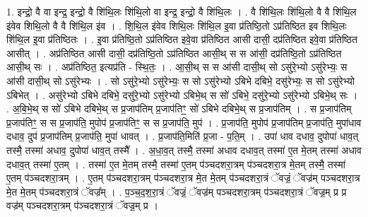 \documentclass[17pt]{extarticle}
\begin{document}
1. इन्द्रो॒ वै वा इन्द्र॒ इन्द्रो॒ वै शि॑थि॒लः शि॑थि॒लो वा इन्द्र॒ इन्द्रो॒ वै शि॑थि॒लः । . वै शि॑थि॒लः शि॑थि॒लो वै वै शि॑थि॒ल इ॑वेव शिथि॒लो वै वै शि॑थि॒ल इ॑व । . शि॒थि॒ल इ॑वेव शिथि॒लः शि॑थि॒ल इ॒वा प्र॑तिष्ठि॒तो ऽप्र॑तिष्ठित इव शिथि॒लः शि॑थि॒ल इ॒वा प्र॑तिष्ठितः । . इ॒वा प्र॑तिष्ठि॒तो ऽप्र॑तिष्ठित इवे॒वा प्र॑तिष्ठित आसी दासी॒ दप्र॑तिष्ठित इवे॒वा प्र॑तिष्ठित आसीत् । . अप्र॑तिष्ठित आसी दासी॒ दप्र॑तिष्ठि॒तो ऽप्र॑तिष्ठित आसी॒थ् स स आ॑सी॒ दप्र॑तिष्ठि॒तो ऽप्र॑तिष्ठित आसी॒थ् सः । . अप्र॑तिष्ठित॒ इत्यप्र॑ति - स्थि॒तः॒ । . आ॒सी॒थ् स स आ॑सी दासी॒थ् सो ऽसु॑रे॒भ्यो ऽसु॑रेभ्यः॒ स आ॑सी दासी॒थ् सो ऽसु॑रेभ्यः । . सो ऽसु॑रे॒भ्यो ऽसु॑रेभ्यः॒ स सो ऽसु॑रेभ्यो ऽबिभे दबिभे॒ दसु॑रेभ्यः॒ स सो ऽसु॑रेभ्यो ऽबिभेत् । . असु॑रेभ्यो ऽबिभे दबिभे॒ दसु॑रे॒भ्यो ऽसु॑रेभ्यो ऽबिभे॒थ् स सो॑ ऽबिभे॒ दसु॑रे॒भ्यो ऽसु॑रेभ्यो ऽबिभे॒थ् सः । . अ॒बि॒भे॒थ् स सो॑ ऽबिभे दबिभे॒थ् स प्र॒जाप॑तिम् प्र॒जाप॑तिꣳ॒॒ सो॑ ऽबिभे दबिभे॒थ् स प्र॒जाप॑तिम् । . स प्र॒जाप॑तिम् प्र॒जाप॑तिꣳ॒॒ स स प्र॒जाप॑ति॒ मुपोप॑ प्र॒जाप॑तिꣳ॒॒ स स प्र॒जाप॑ति॒ मुप॑ । . प्र॒जाप॑ति॒ मुपोप॑ प्र॒जाप॑तिम् प्र॒जाप॑ति॒ मुपा॑धाव दधाव॒ दुप॑ प्र॒जाप॑तिम् प्र॒जाप॑ति॒ मुपा॑ धावत् । . प्र॒जाप॑ति॒मिति॑ प्र॒जा - प॒ति॒म् । . उपा॑ धाव दधाव॒ दुपोपा॑ धाव॒त् तस्मै॒ तस्मा॑ अधाव॒ दुपोपा॑ धाव॒त् तस्मै᳚ । . अ॒धा॒व॒त् तस्मै॒ तस्मा॑ अधाव दधाव॒त् तस्मा॑ ए॒त मे॒तम् तस्मा॑ अधाव दधाव॒त् तस्मा॑ ए॒तम् । . तस्मा॑ ए॒त मे॒तम् तस्मै॒ तस्मा॑ ए॒तम् प॑ञ्चदशरा॒त्रम् प॑ञ्चदशरा॒त्र मे॒तम् तस्मै॒ तस्मा॑ ए॒तम् प॑ञ्चदशरा॒त्रम् । . ए॒तम् प॑ञ्चदशरा॒त्रम् प॑ञ्चदशरा॒त्र मे॒त मे॒तम् प॑ञ्चदशरा॒त्रं ॅवज्रं॒ ॅवज्र॑म् पञ्चदशरा॒त्र मे॒त मे॒तम् प॑ञ्चदशरा॒त्रं ॅवज्र᳚म् । . प॒ञ्च॒द॒श॒रा॒त्रं ॅवज्रं॒ ॅवज्र॑म् पञ्चदशरा॒त्रम् प॑ञ्चदशरा॒त्रं ॅवज्र॒म् प्र प्र वज्र॑म् पञ्चदशरा॒त्रम् प॑ञ्चदशरा॒त्रं ॅवज्र॒म् प्र । \newline
\end{document}
